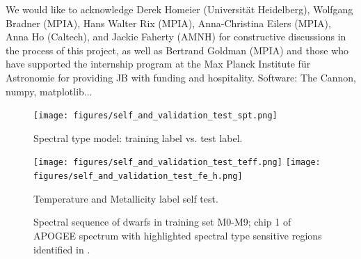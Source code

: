 \documentclass[modern]{aastex62}
\begin{document}
\acknowledgements
We would like to acknowledge Derek Homeier (Universit{\"a}t Heidelberg), Wolfgang Bradner (MPIA), Hans Walter Rix (MPIA), Anna-Christina Eilers (MPIA), Anna Ho (Caltech), and Jackie Faherty (AMNH) for constructive discussions in the process of this project, as well as Bertrand Goldman (MPIA) and those who have supported the internship program at the Max Planck Institute f{\"u}r Astronomie for providing JB with funding and hospitality. \color{red}Software: The Cannon, numpy, matplotlib... \color{black}

\color{gcolor}{HOGG: SDSS acknowledgments... Grants and stuff...}\color{black}  


\newpage

\begin{figure}[ht]
\begin{center}
\texttt{[image: figures/self\_and\_validation\_test\_spt.png]}
\end{center}
\caption{Spectral type model: training label vs. test label.} \label{fig:west_selftest}
\end{figure}

\begin{figure}[ht]
\begin{center}
\texttt{[image: figures/self\_and\_validation\_test\_teff.png]}
\texttt{[image: figures/self\_and\_validation\_test\_fe\_h.png]}
\end{center}
\caption{Temperature and Metallicity label self test.} \label{fig:mann_selftest}
\end{figure}


\begin{figure}[ht]
\caption{ Spectral sequence of dwarfs in training set M0-M9; chip 1 of APOGEE
spectrum with highlighted spectral type sensitive regions identified in \citealt{Desphande:2013}.} \label{fig:sp_sequence}
\end{figure}
\end{document}
